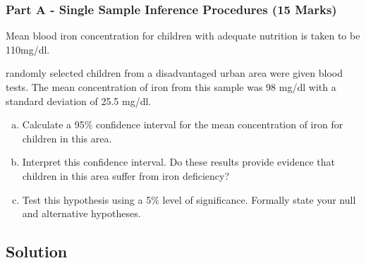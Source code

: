 \documentclass[a4paper,12pt]{article}
\begin{document}
\subsubsection*{Part A - Single Sample Inference Procedures (15 Marks)}
Mean blood iron concentration for children with adequate nutrition is taken to be 110mg/dl. \\ \smallskip

 randomly selected children from a disadvantaged urban area were given blood tests. The mean concentration of iron from this sample was 98 mg/dl with a standard deviation of 25.5 mg/dl.



\medskip
 

\begin{enumerate}[(a)]
\item Calculate a 95\% confidence interval for the mean concentration of iron for children in this area. 
\item Interpret this confidence interval.  Do these results provide evidence that children in this area suffer from iron deficiency? 
\item Test this hypothesis using a 5\% level of significance. Formally state your null and alternative hypotheses.
\end{enumerate}


\subsection*{Solution}
\end{document}
